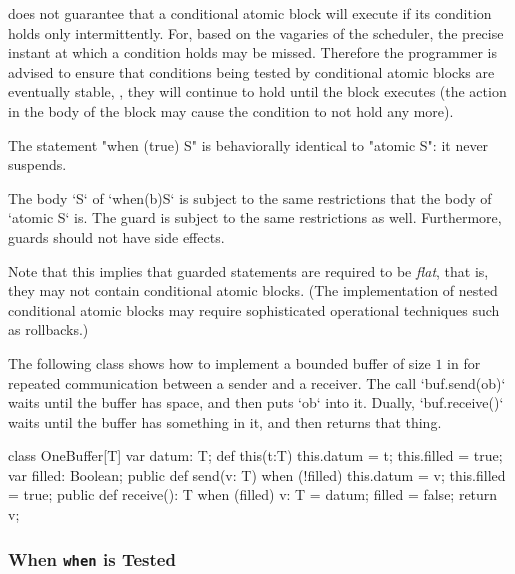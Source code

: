 \Xten{} does not guarantee that a conditional atomic block
will execute if its condition holds only intermittently. For, based on
the vagaries of the scheduler, the precise instant at which a
condition holds may be missed. Therefore the programmer is advised to
ensure that conditions being tested by conditional atomic blocks are
eventually stable, \ie, they will continue to hold until the block
executes (the action in the body of the block may cause the condition
to not hold any more).





The statement \xcd"when (true) S" is
behaviorally identical to \xcd"atomic S": it never suspends.

The body \xcd`S` of \xcd`when(b)S` is subject to the same restrictions that
the body of \xcd`atomic S` is.  The guard is subject to the same restrictions
as well.  Furthermore, guards should not have side effects.


Note that this implies that guarded statements are required to be {\em
flat}, that is, they may not contain conditional atomic blocks. (The
implementation of nested conditional atomic blocks may require
sophisticated operational techniques such as rollbacks.)


\begin{ex}
The following class shows how to implement a bounded buffer of size
$1$ in \Xten{} for repeated communication between a sender and a
receiver.  The call \xcd`buf.send(ob)` waits until the buffer has space, and
then puts \xcd`ob` into it.  Dually, \xcd`buf.receive()` waits until the
buffer has something in it, and then returns that thing.


\begin{xten}
class OneBuffer[T] {
  var datum: T;
  def this(t:T) { this.datum = t; this.filled = true; }
  var filled: Boolean;
  public def send(v: T) {
    when (!filled) {
      this.datum = v;
      this.filled = true;
    }
  }
  public def receive(): T {
    when (filled) {
      v: T = datum;
      filled = false;
      return v;
    }
  }
}
\end{xten}
%
\end{ex}

\subsubsection{When  {\tt when} is Tested}

